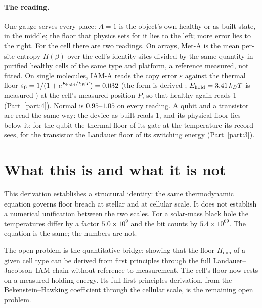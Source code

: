 \paragraph{The reading.} One gauge serves every place: $A=1$ is the object's own healthy or as-built state, in the middle; the floor that physics sets
for it lies to the left; more error lies to the right. For the cell there are two readings. On arrays, Met-A is the mean per-site entropy
$H(\beta)$ over the cell's identity sites divided by the same quantity in purified healthy cells of the same type and platform, a reference
measured, not fitted. \calibrated{} On single molecules, IAM-A reads the copy error $\varepsilon$ against the thermal floor
$\varepsilon_0=1/(1+e^{E_{\rm hold}/k_BT})=0.032$ (the form is derived \derived; $E_{\rm hold}=3.41\,k_BT$ is measured \measured) at the cell's measured position $P$, so
that healthy again reads 1 (Part~\ref{part:4}). Normal is $0.95$--$1.05$ on every reading. A qubit and a transistor are read the same way: the device as built
reads 1, and its physical floor lies below it: for the qubit the thermal floor of its gate at the temperature its record sees, for the
transistor the Landauer floor of its switching energy (Part~\ref{part:3}).

\section{What this is and what it is not}
This derivation establishes a structural identity: the same thermodynamic equation governs floor breach at stellar and at cellular scale. It does
not establish a numerical unification between the two scales. For a solar-mass black hole the temperatures differ by a factor $5.0\times10^{9}$ and
the bit counts by $5.4\times10^{69}$. \calc{} The equation is the same; the numbers are not.

The open problem is the quantitative bridge: showing that the floor $H_{\min}$ of a given cell type can be derived from first principles through
the full Landauer--Jacobson--IAM chain without reference to measurement. The cell's floor now rests on a measured holding energy. Its full
first-principles derivation, from the Bekenstein--Hawking coefficient through the cellular scale, is the remaining open problem. \openprob
\begin{center}\end{center}

